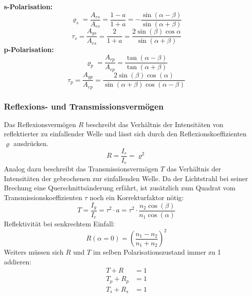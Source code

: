 \documentclass[a4paper, 11pt, ngerman, parskip=half-]{scrartcl}
\begin{document}
\textbf{s-Polarisation:}
%
\begin{equation}
    \label{eq:reflexionskoeffizient_s}
    \varrho_s = \frac{A_{rs}}{A_{es}} = \frac{1-a}{1+a} = -\frac{\sin(\alpha - \beta)}{\sin(\alpha + \beta)}
\end{equation}
%
\begin{equation}
    \label{eq:transmissionskoeffizient_s}
    \tau_s = \frac{A_{gs}}{A_{es}} = \frac{2}{1+a} = \frac{2 \sin (\beta) \cos{\alpha}}{\sin (\alpha + \beta)}
\end{equation}
%
\textbf{p-Polarisation:}
%
\begin{equation}
    \label{eq:reflexionskoeffizient_p}
    \varrho_p = \frac{A_{rp}}{A_{ep}} = \frac{\tan(\alpha - \beta)}{\tan(\alpha + \beta)}
\end{equation}
%
\begin{equation}
    \label{eq:transmissionskoeffizient_p}
    \tau_p = \frac{A_{gp}}{A_{ep}} = \frac{2 \sin(\beta) \cos(\alpha)}{\sin(\alpha + \beta) \cos(\alpha - \beta)}
\end{equation}
%
\subsubsection*{Reflexions- und Transmissionsvermögen}
%
Das Reflexionsvermögen $R$ beschreibt das Verhältnis der Intensitäten von reflektierter
zu einfallender Welle und lässt sich durch den Reflexionskoeffizienten $\varrho$ ausdrücken.
%
\begin{equation}
    \label{eq:reflexionsvermoegen}
    R = \frac{I_r}{I_e} = \varrho^2
\end{equation}
%
Analog dazu beschreibt das Transmissionsvermögen $T$ das Verhältnis der Intensitäten der gebrochenen zur einfallenden Welle.
Da der Lichtstrahl bei seiner Brechung eine Querschnittsänderung erfährt, ist zusätzlich zum Quadrat vom Transmissionskoeffizienten
$\tau$ noch ein Korrekturfaktor nötig:
%
\begin{equation}
    \label{eq:transmissionsvermoegen}
    T = \frac{I_g}{I_e} = \tau^2 \cdot a = \tau^2 \cdot \frac{n_2 \cos(\beta)}{n_1 \cos(\alpha)}
\end{equation}
%
Reflektivität bei senkrechtem Einfall:
%
\begin{equation}
    \label{eq:reflexionsvermoegen_senkrechter_einfall}
    R(\alpha = 0) = \left( \frac{n_1 - n_2}{n_1 + n_2} \right)^2
\end{equation}
%
Weiters müssen sich $R$ und $T$ im selben Polarisationszustand immer zu 1 addieren:
%
\begin{equation}
    \label{eq:summe_reflexion_transmission}
    \begin{split}
        T + R     &= 1 \\
        T_p + R_p &= 1 \\
        T_s + R_s &= 1
    \end{split}
\end{equation}
%
\end{document}
